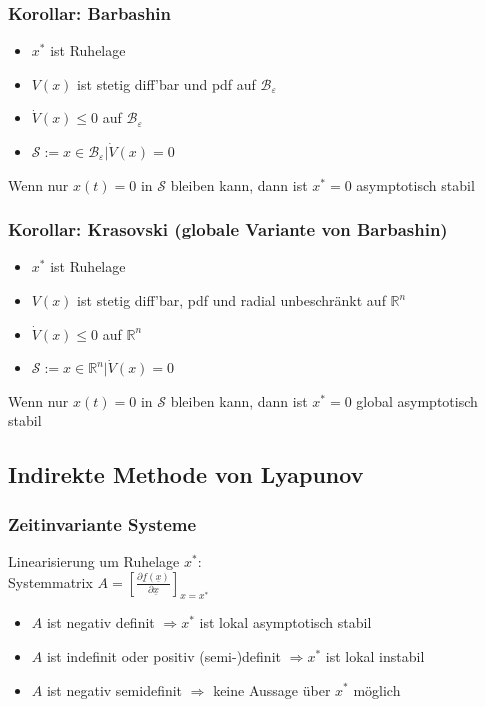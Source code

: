 \documentclass[german]{latex4ei/latex4ei_sheet}
\begin{document}
\subsubsection*{Korollar: Barbashin}
\begin{itemize}
  \item $x^*$ ist Ruhelage
  \item $V(x)$ ist stetig diff'bar und pdf auf $\mathcal{B}_\varepsilon$
  \item $\dot{V}(x) \leq 0$ auf $\mathcal{B}_\varepsilon$
  \item $\mathcal{S} := {x \in \mathcal{B}_\varepsilon | \dot{V}(x) = 0 }$
\end{itemize}
Wenn nur $x(t)=0$ in $\mathcal{S}$ bleiben kann, dann ist $x^* = 0$ asymptotisch stabil

\subsubsection*{Korollar: Krasovski (globale Variante von Barbashin)}
\begin{itemize}
  \item $x^*$ ist Ruhelage
  \item $V(x)$ ist stetig diff'bar, pdf und radial unbeschränkt auf $\mathbb{R}^n$
  \item $\dot{V}(x) \leq 0$ auf $\mathbb{R}^n$
  \item $\mathcal{S} := {x \in \mathbb{R}^n | \dot{V}(x) = 0 }$
\end{itemize}
Wenn nur $x(t)=0$ in $\mathcal{S}$ bleiben kann, dann ist $x^* = 0$ global asymptotisch stabil


\subsection{Indirekte Methode von Lyapunov}

\subsubsection*{Zeitinvariante Systeme}
Linearisierung um Ruhelage $x^*$:\\
Systemmatrix $A = \left[ \frac{\partial \underline{f}(\underline{x})}{\partial \underline{x}} \right]_{x=x^*}$
\begin{itemize}
  \item $A$ ist negativ definit $\Rightarrow x^*$ ist lokal asymptotisch stabil
  \item $A$ ist indefinit oder positiv (semi-)definit $\Rightarrow x^*$ ist lokal instabil
  \item $A$ ist negativ semidefinit $\Rightarrow$ keine Aussage über $x^*$ möglich
\end{itemize}
\end{document}
